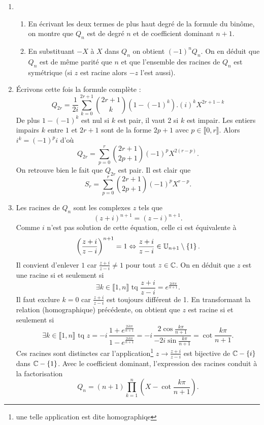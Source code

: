 \begin{enumerate}
\item \begin{enumerate}
 \item En {\'e}crivant les deux termes de plus haut degr{\'e} de la formule du bin{\^o}me, on montre que $Q_{n}$ est de degr{\'e} $n$ et de coefficient dominant $n+1$.
\item En substituant $-X$ à $X$ dans $Q_n$ on obtient $(-1)^{n}Q_n$. On en déduit que $Q_n$ est de même parité que $n$ et que l'ensemble des racines de $Q_n$ est symétrique (si $z$ est racine alors $-z$ l'est aussi).
      \end{enumerate}

\item  \'Ecrivons cette fois la formule compl{\`e}te :
\[
Q_{2r}=\frac{1}{2i}\sum_{k=0}^{2r+1}\binom{2r+1}{k}\left( 1-(-1)^{k}\right).
(i)^{k}X^{2r+1-k}
\]
De plus $1-(-1)^{k}$ est nul si $k$ est pair, il vaut 2 si $k$ est impair. Les entiers impairs $k$ entre $1$ et $2r+1$ sont de la forme $2p+1$ avec $p\in \llbracket 0, r\rrbracket$. Alors $i^{k}=(-1)^{p}i$ d'où
\[
Q_{2r}=\sum_{p=0}^{r}\binom{2r+1}{2p+1}(-1)^{p}X^{2(r-p)}.
\]
 On retrouve bien le fait que $Q_{2r}$ est pair. Il est clair que
\[
S_{r}=\sum_{p=0}^{r}\binom{2r+1}{2p+1}(-1)^{p}X^{r-p}.
\]
  
\item  Les racines de $Q_{n}$ sont les complexes $z$ tels que 
\begin{displaymath}
(z+i)^{n+1}=(z-i)^{n+1} .
\end{displaymath}
Comme $i$ n'est pas solution de cette {\'e}quation, celle ci est {\'e}quivalente {\`a} 
\begin{displaymath}
\left( \frac{z+i}{z-i}\right) ^{n+1}=1 \Leftrightarrow \frac{z+i}{z-i} \in \mathbb{U}_{n+1} \setminus \left\lbrace 1 \right\rbrace.
\end{displaymath}
Il convient d'enlever $1$ car $ \frac{z+i}{z-i}\neq 1$ pour tout $z \in \mathbb{C}$. On en déduit que $z$ est une racine si et seulement si
\begin{displaymath}
\exists k \in \llbracket 1,n \rrbracket \text{ tq } \frac{z+i}{z-i}=e^{\frac{2ik\pi }{n+1}} .
\end{displaymath}
Il faut exclure $k=0$ car $\frac{z+i}{z-i}$ est toujours diff{\'e}rent de 1.\newline
En transformant la relation (homographique) précédente, on obtient que $z$ est racine si et seulement si 
\[
\exists k \in \llbracket 1,n \rrbracket \text{ tq }  z = -i\,\frac{1+e^{\frac{2ik\pi }{n+1}}}{1-e^{\frac{2ik\pi }{n+1}}}
= -i\, \frac{2\cos \frac{k\pi }{n+1}}{-2i\sin \frac{k\pi }{n+1}}
= \cot \frac{k\pi }{n+1}.
\]
Ces racines sont distinctes car l'application\footnote{une telle application est dite homographiqe} $z\rightarrow \frac{z+i}{z-i}$ est bijective de $\mathbb{C}-\{i\}$ dans $\mathbb{C}-\{1\}$. 
Avec le coefficient dominant, l'expression des racines conduit {\`a} la factorisation
\[
Q_{n}=(n+1)\prod_{k=1}^{n}\left( X-\cot \frac{k\pi }{n+1}\right).
\]


\end{enumerate}

